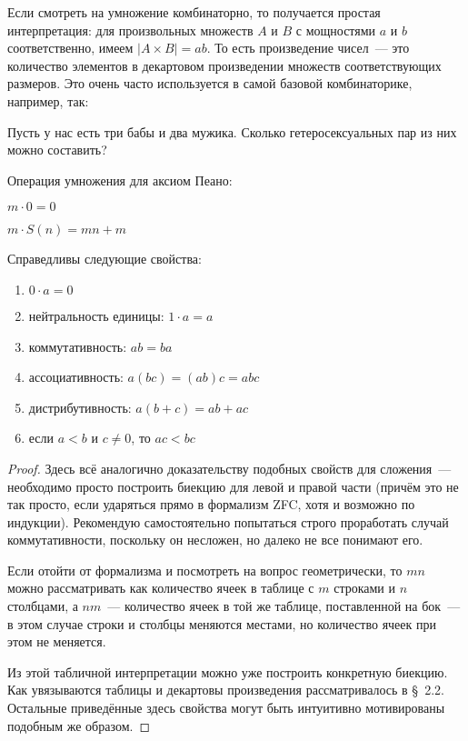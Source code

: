 Если смотреть на умножение комбинаторно, то получается простая интерпретация: для произвольных множеств $A$ и $B$ с мощностями $a$ и $b$ соответственно, имеем $|A\times B| = ab$. То есть произведение чисел~--- это количество элементов в декартовом произведении множеств соответствующих размеров. Это очень часто используется в самой базовой комбинаторике, например, так:

\begin{exercise}
Пусть у нас есть три бабы и два мужика. Сколько гетеросексуальных пар из них можно составить?
\end{exercise}

\begin{definition}
Операция умножения для аксиом Пеано:\newline
\item $m\cdot 0 = 0$\newline
\item $m\cdot S(n) = mn + m$
\end{definition}

\begin{thm}
Справедливы следующие свойства:
\begin{enumerate}
\item $0\cdot a = 0$
\item нейтральность единицы: $1\cdot a = a$
\item коммутативность: $ab = ba$
\item ассоциативность: $a(bc) = (ab)c = abc$
\item дистрибутивность: $a(b+c) = ab + ac$
\item если $a < b$ и $c \not= 0$, то $ac < bc$
\end{enumerate}
\end{thm}
\begin{proof}
Здесь всё аналогично доказательству подобных свойств для сложения~--- необходимо просто построить биекцию для левой и правой части (причём это не так просто, если ударяться прямо в формализм ZFC, хотя и возможно по индукции). Рекомендую самостоятельно попытаться строго проработать случай коммутативности, поскольку он несложен, но далеко не все понимают его.

Если отойти от формализма и посмотреть на вопрос геометрически, то $mn$ можно рассматривать как количество ячеек в таблице с $m$ строками и $n$ столбцами, а $nm$~--- количество ячеек в той же таблице, поставленной на бок~--- в этом случае строки и столбцы меняются местами, но количество ячеек при этом не меняется.

Из этой табличной интерпретации можно уже построить конкретную биекцию. Как увязываются таблицы и декартовы произведения рассматривалось в \S~2.2. Остальные приведённые здесь свойства могут быть интуитивно мотивированы подобным же образом.
\end{proof}

